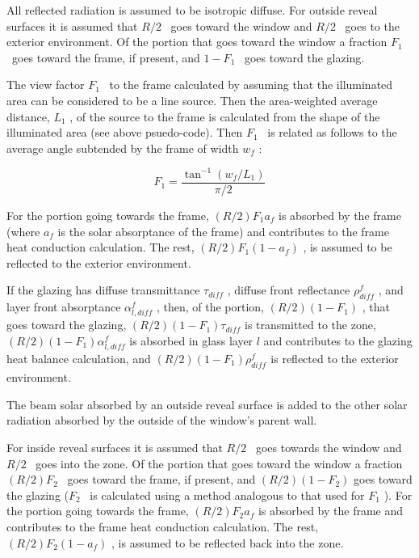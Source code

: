 All reflected radiation is assumed to be isotropic diffuse. For outside reveal surfaces it is assumed that \(R/2\) ~goes toward the window and \(R/2\) ~goes to the exterior environment. Of the portion that goes toward the window a fraction \({F_1}\) ~goes toward the frame, if present, and \(1 - {F_1}\) ~goes toward the glazing.

The view factor \({F_1}\) ~to the frame calculated by assuming that the illuminated area can be considered to be a line source. Then the area-weighted average distance, \({L_1}\) , of the source to the frame is calculated from the shape of the illuminated area (see above psuedo-code). Then \({F_1}\) ~is related as follows to the average angle subtended by the frame of width \({w_f}\) :

\begin{equation}
{F_1} = \frac{{{{\tan }^{ - 1}}({w_f}/{L_1})}}{{\pi /2}}
\end{equation}

For the portion going towards the frame, \((R/2){F_1}{a_f}\) is absorbed by the frame (where \({a_f}\) is the solar absorptance of the frame) and contributes to the frame heat conduction calculation. The rest, \((R/2){F_1}(1 - {a_f})\) , is assumed to be reflected to the exterior environment.

If the glazing has diffuse transmittance \({\tau_{diff}}\) , diffuse front reflectance \(\rho_{diff}^f\) , and layer front absorptance \(\alpha_{l,diff}^f\) , then, of the portion, \((R/2)(1 - {F_1})\) , that goes toward the glazing, \((R/2)(1 - {F_1}){\tau_{diff}}\) is transmitted to the zone, \((R/2)(1 - {F_1})\alpha_{l,diff}^f\) is absorbed in glass layer \(l\) and contributes to the glazing heat balance calculation, and \((R/2)(1 - {F_1})\rho_{dif{f_{}}}^f\) is reflected to the exterior environment.

The beam solar absorbed by an outside reveal surface is added to the other solar radiation absorbed by the outside of the window's parent wall.

For inside reveal surfaces it is assumed that \(R/2\) ~goes towards the window and \(R/2\) ~goes into the zone. Of the portion that goes toward the window a fraction \((R/2){F_2}\) ~goes toward the frame, if present, and \((R/2)(1 - {F_2})\) goes toward the glazing (\({F_2}\) ~is calculated using a method analogous to that used for \({F_1}\) ). For the portion going towards the frame, \((R/2){F_2}{a_f}\) is absorbed by the frame and contributes to the frame heat conduction calculation. The rest, \((R/2){F_2}(1 - {a_f})\) , is assumed to be reflected back into the zone.


